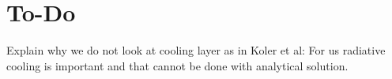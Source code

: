 \section{To-Do}
Explain why we do not look at cooling layer as in Koler et al: For us radiative cooling is important and that cannot be done with analytical solution.